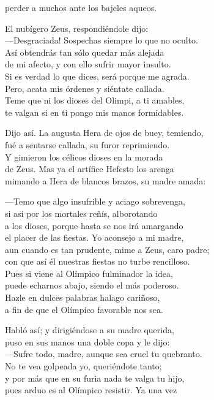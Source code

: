 perder a muchos ante los bajeles aqueos.\par
El nubígero Zeus, respondiéndole dijo:\\
---Desgraciada! Sospechas siempre lo que no oculto.\\
Así obtendrás tan sólo quedar más alejada\\
de mi afecto, y con ello sufrir mayor insulto.\\
Si es verdad lo que dices, será porque me agrada.\\
Pero, acata mis órdenes y siéntate callada.\\
Teme que ni los dioses del Olimpi, a ti amables,\\
te valgan si en ti pongo mis manos formidables.\par
Dijo así. La augusta Hera de ojos de buey, temiendo,\\
fué a sentarse callada, su furor reprimiendo.\\
Y gimieron los célicos dioses en la morada\\
de Zeus. Mas ya el artífice Hefesto los arenga\\
mimando a Hera de blancos brazos, su madre amada:\par
---Temo que algo insufrible y aciago sobrevenga,\\
si así por los mortales reñís, alborotando\\
a los dioses, porque hasta se nos irá amargando\\
el placer de las fiestas. Yo aconsejo a mi madre,\\
aun cuando es tan prudente, mime a Zeus, caro padre;\\
con que así él nuestras fiestas no turbe rencilloso.\\
Pues si viene al Olímpico fulminador la idea,\\
puede echarnos abajo, siendo el más poderoso.\\
Hazle en dulces palabras halago cariñoso,\\
a fin de que el Olímpico favorable nos sea.\par
Habló así; y dirigiéndose a su madre querida,\\
puso en sus manos una doble copa y le dijo:\\
---Sufre todo, madre, aunque sea cruel tu quebranto.\\
No te vea golpeada yo, queriéndote tanto;\\
y por más que en su furia nada te valga tu hijo,\\
pues arduo es al Olímpico resistir. Ya una vez\\
